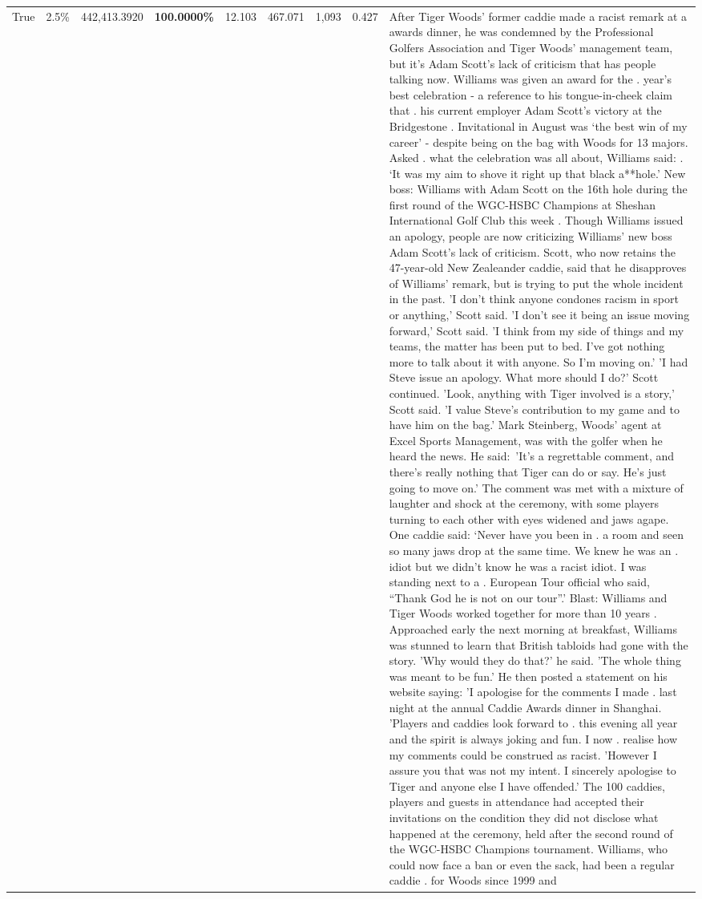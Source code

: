 \begin{table}[H]
\begin{tabular}{lllrlllll}
True & 2.5\% & 442,413.3920 & \bfseries \color{red} 100.0000\% & 12.103 & 467.071 & 1,093 & 0.427 & After Tiger Woods' former caddie made a racist remark at a awards dinner, he was condemned by the Professional Golfers Association and Tiger Woods' management team, but it's Adam Scott's lack of criticism that has people talking now. Williams was given an award for the . year’s best celebration - a reference to his tongue-in-cheek claim that . his current employer Adam Scott’s victory at the Bridgestone . Invitational in August was ‘the best win of my career’ - despite being on the bag with Woods for 13 majors. Asked . what the celebration was all about, Williams said: . ‘It was my aim to shove it right up that black a**hole.’ New boss: Williams with Adam Scott  on the 16th hole during the first round of the WGC-HSBC Champions at Sheshan International Golf Club this week . Though Williams issued an apology, people are now criticizing Williams' new boss Adam Scott's lack of criticism. Scott, who now retains the 47-year-old New Zealeander caddie, said that he disapproves of Williams' remark, but is trying to put the whole incident in the past. 'I don't think anyone condones racism in sport or anything,' Scott said. 'I don't see it being an issue moving forward,' Scott said. 'I think from my side of things and my teams, the matter has been put to bed. I've got nothing more to talk about it with anyone. So I'm moving on.' 'I had Steve issue an apology. What more should I do?' Scott continued. 'Look, anything with Tiger involved is a story,' Scott said. 'I value Steve's contribution to my game and to have him on the bag.' Mark Steinberg, Woods' agent at Excel Sports Management, was with the golfer when he heard the news. He said: 'It's a regrettable comment, and there's really nothing that Tiger can do or say. He's just going to move on.' The comment was met with a mixture of laughter and shock at the ceremony, with some players turning to each other with eyes widened and jaws agape. One caddie said: ‘Never have you been in . a room and seen so many jaws drop at the same time. We knew he was an . idiot but we didn’t know he was a racist idiot. I was standing next to a . European Tour official who said, “Thank God he is not on our tour”.’ Blast: Williams and Tiger Woods worked together for more than 10 years . Approached early the next morning at breakfast, Williams was stunned to learn that British tabloids had gone with the story. 'Why would they do that?' he said. 'The whole thing was meant to be fun.' He then posted a statement on his website saying: 'I apologise for the comments I made . last night at the annual Caddie Awards dinner in Shanghai. 'Players and caddies look forward to . this evening all year and the spirit is always joking and fun. I now . realise how my comments could be construed as racist. 'However I assure you that was not my intent. I sincerely apologise to Tiger and anyone else I have offended.' The 100 caddies, players and guests in attendance had accepted their invitations on the condition they did not disclose what happened at the ceremony, held after the second round of the WGC-HSBC Champions tournament. Williams, who could now face a ban or even the sack, had been a regular caddie . for Woods since 1999 and 
\end{tabular}
\end{table}
